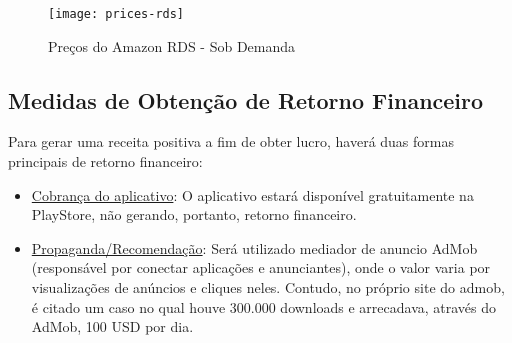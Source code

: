 \begin{figure}[H]
  \centering
  \caption{Preços do Amazon RDS - Sob Demanda}
  \label{fig:prices-rds}
  \texttt{[image: prices-rds]}
\end{figure}	

\subsection{Medidas de Obtenção de Retorno Financeiro}

Para gerar uma receita positiva a fim de obter lucro, haverá duas formas principais de retorno financeiro:
\begin{itemize}
	\item \underline{Cobrança do aplicativo}: O aplicativo estará disponível gratuitamente na PlayStore, não gerando, portanto, retorno financeiro.
	\item \underline{Propaganda/Recomendação}: Será utilizado mediador de anuncio AdMob (responsável por conectar aplicações e anunciantes), onde o valor varia por visualizações de anúncios e cliques neles. Contudo, no próprio site do admob, é citado um caso no qual houve 300.000 downloads e arrecadava, através do AdMob, 100 USD por dia. \cite{GoogleAdMob}
\end{itemize}
